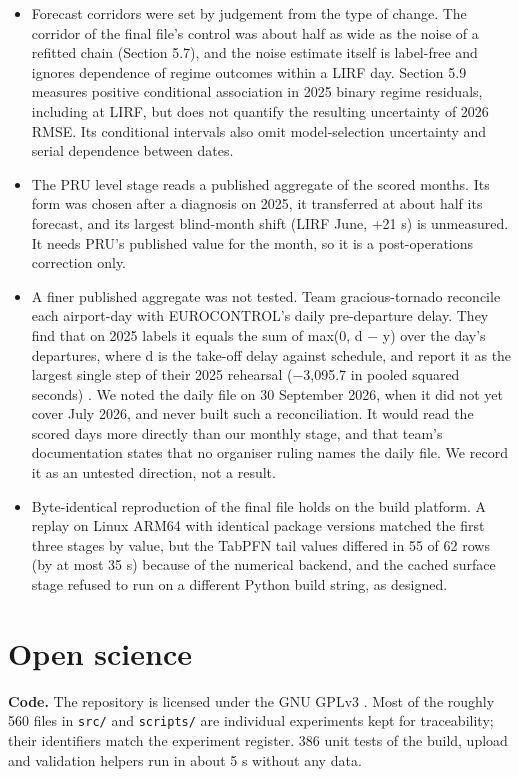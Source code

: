 \documentclass[11pt,a4paper]{article}
\begin{document}
\begin{itemize}
\item
  Forecast corridors were set by judgement from the type of change. The corridor of the final file's control was about half as wide as the noise of a refitted chain (Section 5.7), and the noise estimate itself is label-free and ignores dependence of regime outcomes within a LIRF day. Section 5.9 measures positive conditional association in 2025 binary regime residuals, including at LIRF, but does not quantify the resulting uncertainty of 2026 RMSE. Its conditional intervals also omit model-selection uncertainty and serial dependence between dates.
\item
  The PRU level stage reads a published aggregate of the scored months. Its form was chosen after a diagnosis on 2025, it transferred at about half its forecast, and its largest blind-month shift (LIRF June, +21 s) is unmeasured. It needs PRU's published value for the month, so it is a post-operations correction only.
\item
  A finer published aggregate was not tested. Team gracious-tornado reconcile each airport-day with EUROCONTROL's daily pre-departure delay. They find that on 2025 labels it equals the sum of max(0, d $-$ y) over the day's departures, where d is the take-off delay against schedule, and report it as the largest single step of their 2025 rehearsal ($-$3,095.7 in pooled squared seconds) \autocite{gracioustornado2026}. We noted the daily file on 30 September 2026, when it did not yet cover July 2026, and never built such a reconciliation. It would read the scored days more directly than our monthly stage, and that team's documentation states that no organiser ruling names the daily file. We record it as an untested direction, not a result.
\item
  Byte-identical reproduction of the final file holds on the build platform. A replay on Linux ARM64 with identical package versions matched the first three stages by value, but the TabPFN tail values differed in 55 of 62 rows (by at most 35 s) because of the numerical backend, and the cached surface stage refused to run on a different Python build string, as designed.
\end{itemize}

\section{Open science}\label{open-science}

\textbf{Code.} The repository is licensed under the GNU GPLv3 \autocite{kolomiiets2026repo}. Most of the roughly 560 files in \texttt{src/\allowbreak{}} and \texttt{scripts/\allowbreak{}} are individual experiments kept for traceability; their identifiers match the experiment register. 386 unit tests of the build, upload and validation helpers run in about 5 s without any data.
\end{document}
